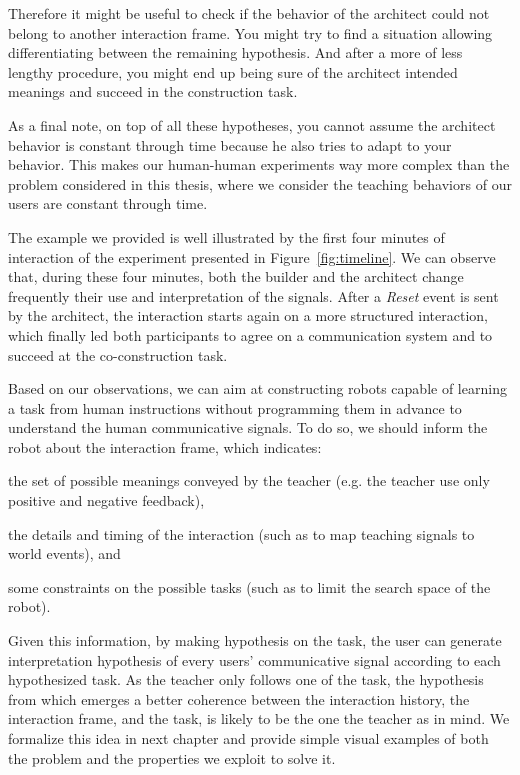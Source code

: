 Therefore it might be useful to check if the behavior of the architect could not belong to another interaction frame. You might try to find a situation allowing differentiating between the remaining hypothesis. And after a more of less lengthy procedure, you might end up being sure of the architect intended meanings and succeed in the construction task.

As a final note, on top of all these hypotheses, you cannot assume the architect behavior is constant through time because he also tries to adapt to your behavior. This makes our human-human experiments way more complex than the problem considered in this thesis, where we consider the teaching behaviors of our users are constant through time.

The example we provided is well illustrated by the first four minutes of interaction of the experiment presented in Figure~\ref{fig:timeline}. We can observe that, during these four minutes, both the builder and the architect change frequently their use and interpretation of the signals. After a \emph{Reset} event is sent by the architect, the interaction starts again on a more structured interaction, which finally led both participants to agree on a communication system and to succeed at the co-construction task.

\transition

Based on our observations, we can aim at constructing robots capable of learning a task from human instructions without programming them in advance to understand the human communicative signals. To do so, we should inform the robot about the interaction frame, which indicates: \begin{inparaenum}[(a)] \item the set of possible meanings conveyed by the teacher (e.g. the teacher use only positive and negative feedback), \item the details and timing of the interaction (such as to map teaching signals to world events), and \item some constraints on the possible tasks (such as to limit the search space of the robot). \end{inparaenum} Given this information, by making hypothesis on the task, the user can generate interpretation hypothesis of every users' communicative signal according to each hypothesized task. As the teacher only follows one of the task, the hypothesis from which emerges a better coherence between the interaction history, the interaction frame, and the task, is likely to be the one the teacher as in mind. We formalize this idea in next chapter and provide simple visual examples of both the problem and the properties we exploit to solve it.
